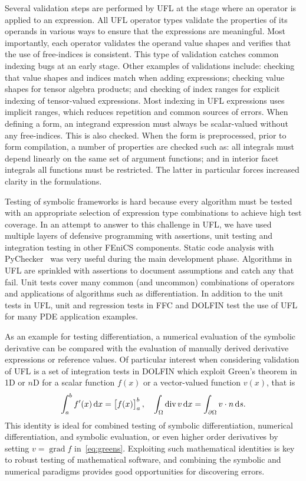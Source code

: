 \documentclass[prodmode,acmtoms]{acmsmall}
\DeclareMathOperator{\Div}{div}
\DeclareMathOperator{\Grad}{grad}
\newcommand{\dx}{\dif{}x}
\newcommand{\ds}{\dif{}s}
\begin{document}
Several validation steps are performed by UFL at the stage where an
operator is applied to an expression. All UFL operator types validate
the properties of its operands in various ways to ensure that the
expressions are meaningful. Most importantly, each operator validates
the operand value shapes and verifies that the use of free-indices is
consistent. This type of validation catches common indexing bugs at an
early stage. Other examples of validations include: checking that
value shapes and indices match when adding expressions; checking value
shapes for tensor algebra products;
and checking of index ranges for explicit indexing of tensor-valued expressions.
Most indexing in UFL
expressions uses implicit ranges, which reduces repetition and common
sources of errors. When defining a form, an integrand expression must
always be scalar-valued without any free-indices. This is also
checked.  When the form is preprocessed, prior to form compilation, a
number of properties are checked such as: all integrals must depend
linearly on the same set of argument functions; and in interior
facet integrals all functions must be restricted. The latter in
particular forces increased clarity in the formulations.

Testing of symbolic frameworks is hard because every
algorithm must be tested with an appropriate selection of expression
type combinations to achieve high test coverage. In an attempt to
answer to this challenge in UFL, we have used multiple layers of
defensive programming with assertions, unit testing and integration
testing in other FEniCS components. Static code analysis with
PyChecker~\citep{pychecker:www} was very useful during the main
development phase. Algorithms in UFL are sprinkled with assertions to
document assumptions and catch any that fail. Unit tests cover many
common (and uncommon) combinations of operators and applications of
algorithms such as differentiation. In addition to the unit tests in
UFL, unit and regression tests in FFC and DOLFIN test the use of UFL
for many PDE application examples.

As an example for testing differentiation, a numerical evaluation of
the symbolic derivative can be compared with the evaluation of
manually derived derivative expressions or reference values. Of
particular interest when considering validation of UFL is a set of
integration tests in DOLFIN which exploit Green's theorem in 1D or $n$D
for a scalar function $f(x)$ or a vector-valued function $v(x)$, that
is
\begin{equation}
  \int_a^b f^\prime(x) \dx = \left[f(x)\right]_a^b, \quad
  \int_\Omega \Div v \dx = \int_{\partial\Omega} v \cdot n \ds.
\label{eq:greens}
\end{equation}
This identity is ideal for combined testing of symbolic
differentiation, numerical differentiation, and symbolic evaluation,
or even higher order derivatives by setting $v = \Grad f$
in~\eqref{eq:greens}. Exploiting such mathematical identities is key
to robust testing of mathematical software, and combining the symbolic
and numerical paradigms provides good opportunities for discovering
errors.
\end{document}
